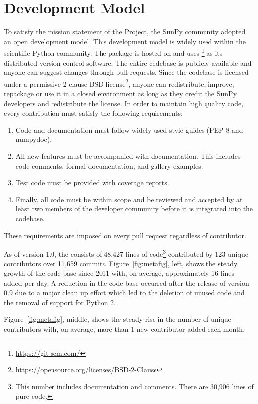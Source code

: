 \section{Development Model}
\label{sec:development}

To satisfy the mission statement of the Project, the SunPy community adopted an open development model.
This development model is widely used within the scientific Python community.
The \sunpypkg package is hosted on \github and uses \footnote{\url{https://git-scm.com/}} as its distributed version control software.
The entire codebase is publicly available and anyone can suggest changes through pull requests.
Since the codebase is licensed under a permissive 2-clause BSD license\footnote{\url{https://opensource.org/licenses/BSD-2-Clause}}, anyone can redistribute, improve, repackage or use it in a closed environment as long as they credit the SunPy developers and redistribute the license.
In order to maintain high quality code, every contribution must satisfy the following requirements:
\begin{enumerate}
    \item Code and documentation must follow widely used style guides (PEP 8 and numpydoc).
    \item All new features must be accompanied with documentation.
    This includes code comments, formal documentation, and gallery examples.
    \item Test code must be provided with coverage reports.
    \item Finally, all code must be within scope and be reviewed and accepted by at least two members of the developer community before it is integrated into the codebase.
\end{enumerate}
These requirements are imposed on every pull request regardless of contributor.

As of version 1.0, the \sunpypkg consists of 48,427 lines of code\footnote{This number includes documentation and comments. There are 30,906 lines of pure code.} contributed by 123 unique contributors over 11,659 \git commits. Figure~\ref{fig:metafig}, left, shows the steady growth of the code base since 2011 with, on average, approximately 16 lines added per day.
A reduction in the code base occurred after the release of version 0.9 due to a major clean up effort which led to the deletion of unused code and the removal of support for Python 2.

Figure~\ref{fig:metafig}, middle, shows the steady rise in the number of unique contributors with, on average, more than 1 new contributor added each month.

